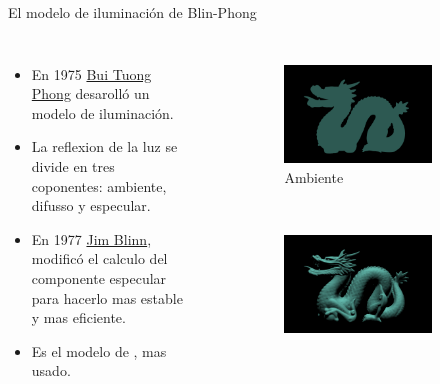 \begin{frame}{El modelo de iluminación de Blin-Phong}
\begin{columns}
\begin{itemize}
 \item En 1975 \href{https://en.wikipedia.org/wiki/Phong_reflection_model}{Bui Tuong Phong} desarolló un modelo de iluminación.
 \item La reflexion de la luz se divide en tres coponentes: ambiente, difusso y especular.
 \item En 1977 \href{https://en.wikipedia.org/wiki/Blinn-Phong_reflection_model}{Jim Blinn}, modificó el calculo del componente especular para hacerlo mas estable y mas eficiente.
 \item Es el modelo de , mas usado.
\end{itemize}
\begin{figure}[htp]
 \centering
 \begin{subfigure}[b]{0.42\textwidth}
   \includegraphics[width=\textwidth]{img/ambiente}
   \caption{Ambiente}
 \end{subfigure}
~
 \begin{subfigure}[b]{0.42\textwidth}
   \includegraphics[width=\textwidth]{img/difuso}

\end{subfigure}
\end{figure}
\end{columns}
\end{frame}

